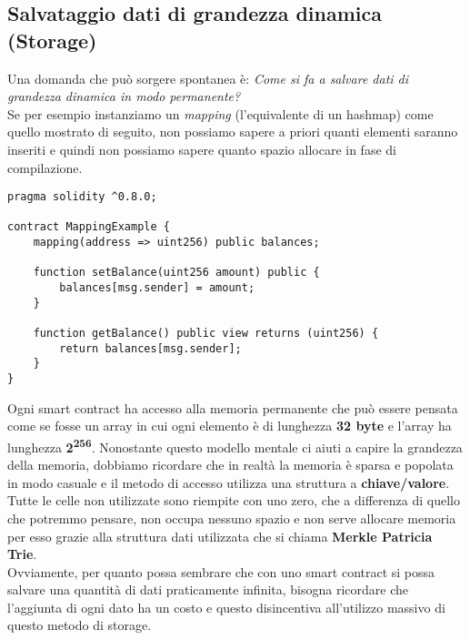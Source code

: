 \subsection{Salvataggio dati di grandezza dinamica (Storage)}
Una domanda che può sorgere spontanea è: \textit{Come si fa a salvare dati di
grandezza dinamica in modo permanente?} \\
Se per esempio instanziamo un \textit{mapping} (l'equivalente di un hashmap)
come quello mostrato di seguito, non possiamo sapere a priori quanti elementi
saranno inseriti e quindi non possiamo sapere quanto spazio allocare in fase di
compilazione.

\begin{lstlisting}[language=Solidity]
pragma solidity ^0.8.0;

contract MappingExample {
    mapping(address => uint256) public balances;

    function setBalance(uint256 amount) public {
        balances[msg.sender] = amount;
    }

    function getBalance() public view returns (uint256) {
        return balances[msg.sender];
    }
}
\end{lstlisting}

Ogni smart contract ha accesso alla memoria permanente che può essere pensata
come se fosse un array in cui ogni elemento è di lunghezza \textbf{32 byte} e
l'array ha lunghezza \textbf{2\textsuperscript{256}}. Nonostante questo modello
mentale ci aiuti a capire la grandezza della memoria, dobbiamo ricordare che in
realtà la memoria è sparsa e popolata in modo casuale e il metodo di accesso
utilizza una struttura a \textbf{chiave/valore}. Tutte le celle non utilizzate
sono riempite con uno zero, che a differenza di quello che potremmo pensare,
non occupa nessuno spazio e non serve allocare memoria per esso grazie alla
struttura dati utilizzata che si chiama \textbf{Merkle Patricia Trie}. \\
Ovviamente, per quanto possa sembrare che con uno smart contract si possa 
salvare una quantità di dati praticamente infinita, bisogna ricordare che 
l'aggiunta di ogni dato ha un costo e questo disincentiva all'utilizzo massivo
di questo metodo di storage. \texttt{}\cite{storageSize}

\newpage

